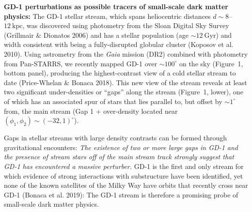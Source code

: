 \documentclass[11pt]{article}
\begin{document}
\textbf{GD-1 perturbations as possible tracers of small-scale dark matter physics:}
The GD-1 stellar stream, which spans heliocentric distances $d\sim 8$--$12~\textrm{kpc}$, was discovered using photometry from the Sloan Digital Sky Survey (Grillmair \& Dionatos 2006) and has a stellar population (age $\sim 12~\textrm{Gyr}$) and width consistent with being a fully-disrupted globular cluster (Koposov et al. 2010).
Using astrometry from the \textit{Gaia} mission (DR2) combined with photometry from Pan-STARRS, we recently mapped GD-1 over $\sim 100^\circ$ on the sky (Figure~1, bottom panel), producing the highest-contrast view of a cold stellar stream to date (Price-Whelan \& Bonaca 2018).
This new view of the stream reveals at least two significant under-densities or ``gaps'' along the stream (Figure~1, lower), one of which has an associated spur of stars that lies parallel to, but offset by $\sim1^\circ$ from, the main stream (Gap 1 + over-density located near $(\phi_1, \phi_2) \sim (-32, 1)^\circ$).

Gaps in stellar streams with large density contrasts can be formed through gravitational encounters:
\emph{The existence of two or more large gaps in GD-1 and the presence of stream stars off of the main stream track strongly suggest that GD-1 has encountered a massive perturber.}
GD-1 is the first and only stream for which evidence of strong interactions with substructure have been identified, yet none of the known satellites of the Milky Way have orbits that recently cross near GD-1 (Bonaca et al. 2019):
The GD-1 stream is therefore a promising probe of small-scale dark matter physics.
\end{document}
